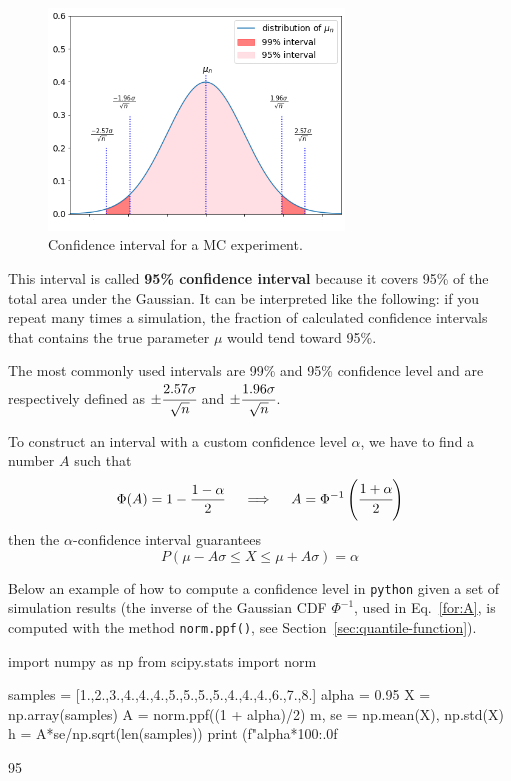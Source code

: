 \begin{figure}[htb]
\centering
\includegraphics[width=0.7\textwidth]{figures/confidence_interval}
\caption{Confidence interval for a MC experiment.}
\label{fig:confidence_interval}
\end{figure}

This interval is called \textbf{95\% confidence interval} because it covers 95\% of the total area under the Gaussian. It can be interpreted like the following: if you repeat many times a simulation, the fraction of calculated confidence intervals that contains the true parameter $\mu$ would tend toward 95\%.

The most commonly used intervals are 99\% and 95\% confidence level and are respectively defined as \(\pm \cfrac{2.57\sigma}{\sqrt{n}}\) and \(\pm \cfrac{1.96\sigma}{\sqrt{n}}\).

To construct an interval with a custom confidence level $\alpha$, we have to find a number $A$ such that
\begin{equation}
\Phi(A) = 1 - \frac{1-\alpha}{2}\quad\implies\quad A = \Phi^{-1}\left(\cfrac{1+\alpha}{2}\right)
\label{for:A}
\end{equation}
then the $\alpha$-confidence interval guarantees
\begin{equation}
P(\mu - A\sigma \le X \le \mu+ A\sigma) = \alpha 
\end{equation}

Below an example of how to compute a confidence level in \texttt{python} given a set of simulation results (the inverse of the Gaussian CDF $\Phi^{-1}$, used in Eq.~\ref{for:A}, is computed with the method \texttt{norm.ppf()}, see Section~\ref{sec:quantile-function}).

\begin{ipython}
import numpy as np
from scipy.stats import norm

samples = [1.,2.,3.,4.,4.,4.,5.,5.,5.,5.,4.,4.,4.,6.,7.,8.]
alpha = 0.95
X = np.array(samples)
A = norm.ppf((1 + alpha)/2)
m, se = np.mean(X), np.std(X)
h = A*se/np.sqrt(len(samples))
print (f"{alpha*100:.0f}%
\end{ipython}
\begin{ioutput}
95%
\end{ioutput}


